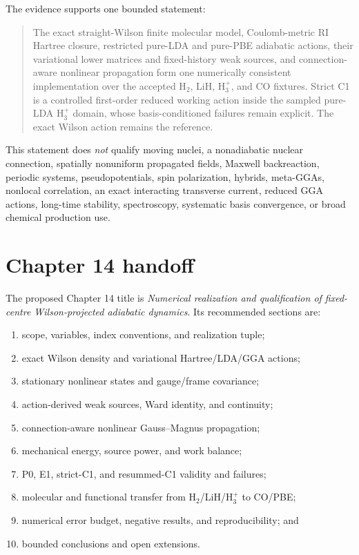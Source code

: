 \documentclass[11pt]{article}
\begin{document}
The evidence supports one bounded statement:

\begin{quote}
The exact straight-Wilson finite molecular model, Coulomb-metric RI Hartree
closure, restricted pure-LDA and pure-PBE adiabatic actions, their variational
lower matrices and fixed-history weak sources, and connection-aware nonlinear
propagation form one numerically consistent implementation over the accepted
H$_2$, LiH, H$_3^+$, and CO fixtures.  Strict C1 is a controlled first-order
reduced working action inside the sampled pure-LDA H$_3^+$ domain, whose
basis-conditioned failures remain explicit.  The exact Wilson action remains
the reference.
\end{quote}

This statement does \emph{not} qualify moving nuclei, a nonadiabatic nuclear
connection, spatially nonuniform propagated fields, Maxwell backreaction,
periodic systems, pseudopotentials, spin polarization, hybrids, meta-GGAs,
nonlocal correlation, an exact interacting transverse current, reduced GGA
actions, long-time stability, spectroscopy, systematic basis convergence, or
broad chemical production use.

\section{Chapter 14 handoff}

The proposed Chapter 14 title is \emph{Numerical realization and
qualification of fixed-centre Wilson-projected adiabatic dynamics}.  Its
recommended sections are:

\begin{enumerate}
  \item scope, variables, index conventions, and realization tuple;
  \item exact Wilson density and variational Hartree/LDA/GGA actions;
  \item stationary nonlinear states and gauge/frame covariance;
  \item action-derived weak sources, Ward identity, and continuity;
  \item connection-aware nonlinear Gauss--Magnus propagation;
  \item mechanical energy, source power, and work balance;
  \item P0, E1, strict-C1, and resummed-C1 validity and failures;
  \item molecular and functional transfer from H$_2$/LiH/H$_3^+$ to CO/PBE;
  \item numerical error budget, negative results, and reproducibility; and
  \item bounded conclusions and open extensions.
\end{enumerate}
\end{document}
